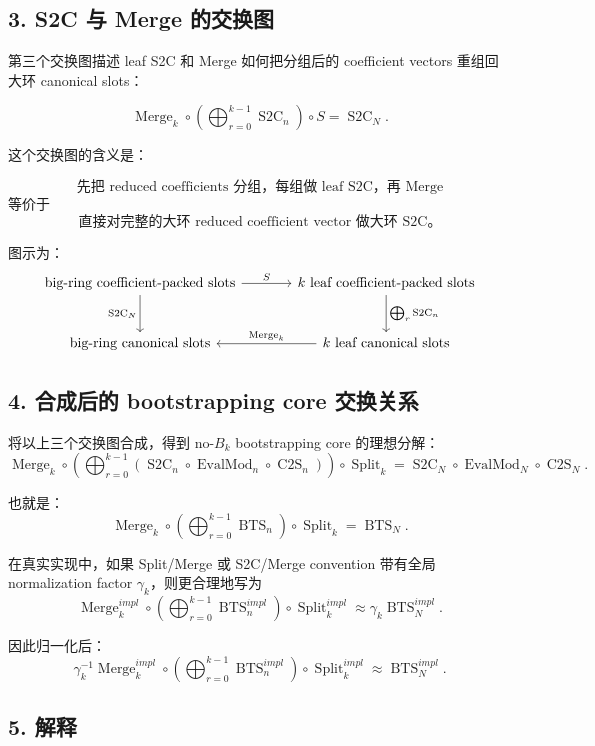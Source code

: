 \documentclass[UTF8,11pt]{ctexart}
\theoremstyle{definition}
\newcommand{\CtwoS}{\operatorname{C2S}}
\newcommand{\StwoC}{\operatorname{S2C}}
\newcommand{\BTS}{\operatorname{BTS}}
\newcommand{\Split}{\operatorname{Split}}
\newcommand{\Merge}{\operatorname{Merge}}
\newcommand{\EvalMod}{\operatorname{EvalMod}}
\begin{document}
\subsection*{3. S2C 与 Merge 的交换图}

第三个交换图描述 leaf S2C 和 Merge 如何把分组后的 coefficient vectors 重组回大环 canonical slots：

\[
\boxed{
\Merge_k
\circ
\left(
\bigoplus_{r=0}^{k-1}\StwoC_n
\right)
\circ
S
=
\StwoC_N.
}
\]

这个交换图的含义是：

\[
\text{先把 reduced coefficients 分组，每组做 leaf S2C，再 Merge}
\]
等价于
\[
\text{直接对完整的大环 reduced coefficient vector 做大环 S2C。}
\]

图示为：
\[
\begin{tikzcd}[column sep=large,row sep=large]
\text{big-ring coefficient-packed slots}
    \arrow[r,"S"]
    \arrow[d,"\StwoC_N"']
&
\text{\(k\) leaf coefficient-packed slots}
    \arrow[d,"\bigoplus_r \StwoC_n"]
\\
\text{big-ring canonical slots}
&
\text{\(k\) leaf canonical slots}
    \arrow[l,"\Merge_k"']
\end{tikzcd}
\]

\subsection*{4. 合成后的 bootstrapping core 交换关系}

将以上三个交换图合成，得到 no-\(B_k\) bootstrapping core 的理想分解：
\[
\boxed{
\Merge_k
\circ
\left(
\bigoplus_{r=0}^{k-1}
\left(
\StwoC_n\circ\EvalMod_n\circ\CtwoS_n
\right)
\right)
\circ
\Split_k
=
\StwoC_N\circ\EvalMod_N\circ\CtwoS_N.
}
\]

也就是：
\[
\boxed{
\Merge_k
\circ
\left(
\bigoplus_{r=0}^{k-1}\BTS_n
\right)
\circ
\Split_k
=
\BTS_N.
}
\]

在真实实现中，如果 Split/Merge 或 S2C/Merge convention 带有全局 normalization factor \(\gamma_k\)，则更合理地写为
\[
\boxed{
\Merge_k^{impl}
\circ
\left(
\bigoplus_{r=0}^{k-1}\BTS_n^{impl}
\right)
\circ
\Split_k^{impl}
\approx
\gamma_k \BTS_N^{impl}.
}
\]

因此归一化后：
\[
\boxed{
\gamma_k^{-1}
\Merge_k^{impl}
\circ
\left(
\bigoplus_{r=0}^{k-1}\BTS_n^{impl}
\right)
\circ
\Split_k^{impl}
\approx
\BTS_N^{impl}.
}
\]

\subsection*{5. 解释}
\end{document}
